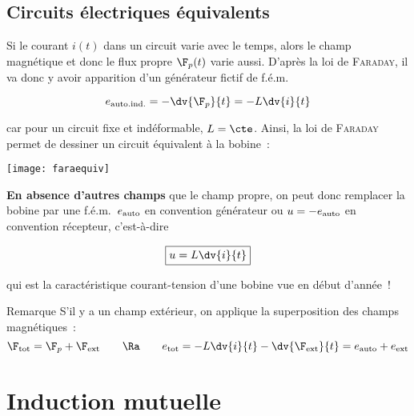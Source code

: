 \documentclass[../main/main.tex]{subfiles}
\begin{document}
\subsection{Circuits électriques équivalents}
\label{ssec:celecequiv}
Si le courant $i(t)$ dans un circuit varie avec le temps, alors le champ
magnétique et donc le flux propre $\F_p(t)$ varie aussi. D'après la loi de
\textsc{Faraday}, il va donc y avoir apparition d'un générateur fictif de
f.é.m.\
\begin{hide}
  \[
    e_{\rm auto.ind.} = -\dv{\F_p}{t} = -L \dv{i}{t}
  \]
\end{hide}
car pour un circuit fixe et indéformable, $L = \cte$. Ainsi, la loi de
\textsc{Faraday} permet de dessiner un circuit équivalent à la bobine~:
\begin{hide}
  \begin{center}
    \texttt{[image: faraequiv]}
    \label{fig:faraequiv}
  \end{center}
\end{hide}
\textbf{En absence d'autres champs} que le champ propre, on peut donc remplacer
la bobine par une f.é.m.\ $e_{\rm auto}$ en convention générateur ou $u =
-e_{\rm auto}$ en convention récepteur, c'est-à-dire
\begin{hide}
  \[
    \boxed{u = L \dv{i}{t}}
  \]
\end{hide}
qui est la caractéristique courant-tension d'une bobine vue en début d'année~!

\begin{rrema}{Remarque}
  S'il y a un champ extérieur, on applique la superposition des champs
  magnétiques~:
  \[
    \F_{\rm tot} = \F_p + \F_{\rm ext}
    \qquad
    \Ra 
    \qquad
    e_{\rm tot} = -L \dv{i}{t} - \dv{\F_{\rm ext}}{t} = e_{\rm auto} + e_{\rm ext}
  \]
\end{rrema}

\section{Induction mutuelle}
\label{sec:inducmut}
\end{document}
